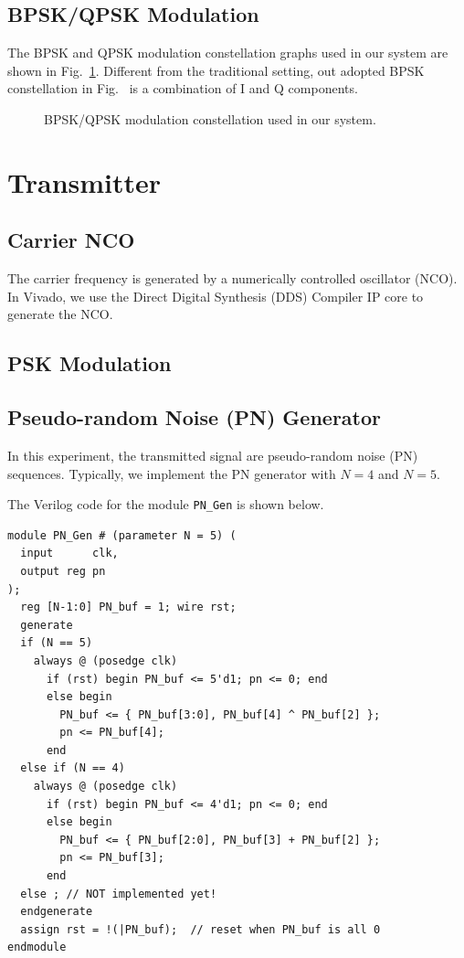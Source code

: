 \documentclass[journal,twoside]{IEEEtran}
\begin{document}
    \subsection{BPSK/QPSK Modulation}

      The BPSK and QPSK modulation constellation graphs used in our system are shown in Fig.~\ref{fig:constellation}.
      Different from the traditional setting, out adopted BPSK constellation in Fig.~
      is a combination of I and Q components.
      \begin{figure}[htbp]
        \hfill%
        \caption{BPSK/QPSK modulation constellation used in our system.}
        \label{fig:constellation}
      \end{figure}

    \IEEEpubidadjcol
    \section{Transmitter}

    \subsection{Carrier NCO}

      The carrier frequency is generated by a numerically controlled oscillator (NCO).
      In Vivado, we use the Direct Digital Synthesis (DDS) Compiler IP core to generate the NCO.

  \subsection{PSK Modulation}

    \subsection{Pseudo-random Noise (PN) Generator}

      In this experiment, the transmitted signal are pseudo-random noise (PN) sequences.
      Typically, we implement the PN generator with $N=4$ and $N=5$. %

      \newpage
      The Verilog code for the module \texttt{PN\_Gen} is shown below.
      \begin{verbatim}
module PN_Gen # (parameter N = 5) (
  input      clk,
  output reg pn
);
  reg [N-1:0] PN_buf = 1; wire rst;
  generate
  if (N == 5)
    always @ (posedge clk)
      if (rst) begin PN_buf <= 5'd1; pn <= 0; end
      else begin
        PN_buf <= { PN_buf[3:0], PN_buf[4] ^ PN_buf[2] };
        pn <= PN_buf[4];
      end
  else if (N == 4)
    always @ (posedge clk)
      if (rst) begin PN_buf <= 4'd1; pn <= 0; end
      else begin
        PN_buf <= { PN_buf[2:0], PN_buf[3] + PN_buf[2] };
        pn <= PN_buf[3];
      end
  else ; // NOT implemented yet!
  endgenerate
  assign rst = !(|PN_buf);  // reset when PN_buf is all 0
endmodule
      \end{verbatim}
\end{document}

